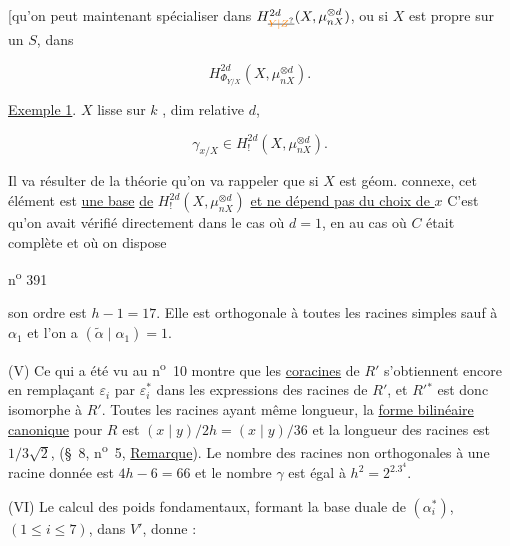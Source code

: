 [qu'on peut maintenant spécialiser dans $H^{2d}_{\deleted{\unsure{Y|Z}}}(X,\mu_{nX}^{\otimes d})$, ou si $X$ est propre sur un $S$, dans

\[
H^{2d}_{\Phi_{Y/X}}(X,\mu_{nX}^{\otimes d}).
\]



\uline{Exemple 1}. $X$ lisse sur $k$ ,  dim relative $d$,  

\[
\gamma_{x/X}\in H^{2d}_!(X,\mu_{nX}^{\otimes d}).
\]

Il va résulter de la théorie qu'on va rappeler que  si $X$ est géom. connexe, cet élément est \uline{une base} \uline{de} $H^{2d}_!(X,\mu_{nX}^{\otimes d})$ \uline{et ne dépend pas du choix de $x$}  C'est qu'on avait vérifié directement dans le cas où $d=1$, en  au cas où $C$ était complète et où on dispose 

\hfill n\textsuperscript{o} 391

son ordre est $h-1=17$. Elle est orthogonale à toutes les racines simples sauf à $\alpha_1$ et l'on a $(\tilde\alpha\mid\alpha_1)=1$.

(V) Ce qui a été vu au n\textsuperscript{o}~10 montre que les \uline{coracines} de $R'$ s'obtiennent encore en remplaçant $\varepsilon_i$ par $\varepsilon_i^*$ dans les expressions des racines de $R'$, et $R'{}^*$ est donc isomorphe à $R'$. Toutes les racines ayant même longueur, la \uline{forme bilinéaire canonique} pour $R$ est $(x\mid y)/2h=(x\mid y)/36$ et la longueur des racines est $1/3\sqrt{2}$, (\S~8, n\textsuperscript{o}~5, \uline{Remarque}). Le nombre des racines non orthogonales à une racine donnée est $4h-6=66$ et le nombre $\gamma$ est égal à $h^2=2^2.3^4$.

(VI) Le calcul des poids fondamentaux, formant la base duale de $(\alpha_i^*)$, $(1\leq i\leq7)$, dans $V'$, donne :

